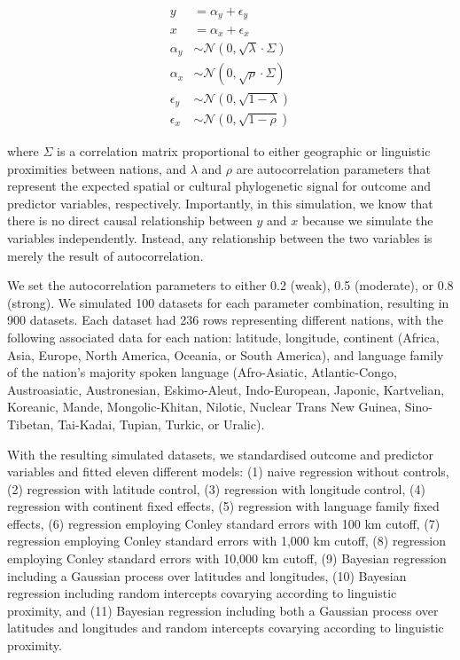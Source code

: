 \documentclass[english,man,floatsintext]{apa6}
\begin{document}
\[
\begin{aligned}
y &= \alpha_y + \epsilon_y \\
x &= \alpha_x + \epsilon_x \\
\alpha_y &\sim \mathcal{N}(0, \sqrt{\lambda} \cdot \Sigma) \\
\alpha_x &\sim \mathcal{N}(0, \sqrt{\rho} \cdot \Sigma) \\
\epsilon_y &\sim \mathcal{N}(0, \sqrt{1 - \lambda}) \\
\epsilon_x &\sim \mathcal{N}(0, \sqrt{1 - \rho})
\end{aligned}
\]

where \(\Sigma\) is a correlation matrix proportional to either geographic or linguistic proximities between nations, and \(\lambda\) and \(\rho\) are autocorrelation parameters that represent the expected spatial or cultural phylogenetic signal for outcome and predictor variables, respectively. Importantly, in this simulation, we know that there is no direct causal relationship between \(y\) and \(x\) because we simulate the variables independently. Instead, any relationship between the two variables is merely the result of autocorrelation.

We set the autocorrelation parameters to either 0.2 (weak), 0.5 (moderate), or 0.8 (strong). We simulated 100 datasets for each parameter combination, resulting in 900 datasets. Each dataset had 236 rows representing different nations, with the following associated data for each nation: latitude, longitude, continent (Africa, Asia, Europe, North America, Oceania, or South America), and language family of the nation's majority spoken language (Afro-Asiatic, Atlantic-Congo, Austroasiatic, Austronesian, Eskimo-Aleut, Indo-European, Japonic, Kartvelian, Koreanic, Mande, Mongolic-Khitan, Nilotic, Nuclear Trans New Guinea, Sino-Tibetan, Tai-Kadai, Tupian, Turkic, or Uralic).

With the resulting simulated datasets, we standardised outcome and predictor variables and fitted eleven different models: (1) naive regression without controls, (2) regression with latitude control, (3) regression with longitude control, (4) regression with continent fixed effects, (5) regression with language family fixed effects, (6) regression employing Conley standard errors with 100 km cutoff, (7) regression employing Conley standard errors with 1,000 km cutoff, (8) regression employing Conley standard errors with 10,000 km cutoff, (9) Bayesian regression including a Gaussian process over latitudes and longitudes, (10) Bayesian regression including random intercepts covarying according to linguistic proximity, and (11) Bayesian regression including both a Gaussian process over latitudes and longitudes and random intercepts covarying according to linguistic proximity.
\end{document}
